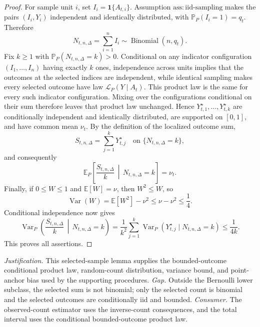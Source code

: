 \documentclass{article}
\begin{document}
\begin{proof}
For sample unit \(i\), set \(I_i=\mathbf1\{A_{t,i}\}\).  Assumption \(\mathrm{ass:iid\text{-}sampling}\) makes the pairs \((I_i,Y_i)\) independent and identically distributed, with \(\mathbb P_P(I_i=1)=q_t\).  Therefore
\[
 N_{t,n,\Delta}=\sum_{i=1}^n I_i\sim\operatorname{Binomial}(n,q_t).
\]
Fix \(k\geq1\) with \(\mathbb P_P(N_{t,n,\Delta}=k)>0\).  Conditional on any indicator configuration \((I_1,\ldots,I_n)\) having exactly \(k\) ones, independence across units implies that the outcomes at the selected indices are independent, while identical sampling makes every selected outcome have law \(\mathcal L_P(Y\mid A_t)\).  This product law is the same for every such indicator configuration.  Mixing over the configurations conditional on their sum therefore leaves that product law unchanged.  Hence \(Y_{t,1}^{\star},\ldots,Y_{t,k}^{\star}\) are conditionally independent and identically distributed, are supported on \([0,1]\), and have common mean \(\nu_t\).  By the definition of the localized outcome sum,
\[
 S_{t,n,\Delta}=\sum_{j=1}^kY_{t,j}^{\star}
 \quad\text{on }\{N_{t,n,\Delta}=k\},
\]
and consequently
\[
 \mathbb E_P\!\left[\frac{S_{t,n,\Delta}}k\,\middle|\,N_{t,n,\Delta}=k\right]=\nu_t.
\]
Finally, if \(0\leq W\leq1\) and \(\mathbb E[W]=\nu\), then \(W^2\leq W\), so
\[
 \operatorname{Var}(W)=\mathbb E[W^2]-\nu^2
 \leq\nu-\nu^2\leq\frac14.
\]
Conditional independence now gives
\[
 \operatorname{Var}_P\!\left(\frac{S_{t,n,\Delta}}k\,\middle|\,N_{t,n,\Delta}=k\right)
 =\frac1{k^2}\sum_{j=1}^k
 \operatorname{Var}_P(Y_{t,j}^{\star}\mid N_{t,n,\Delta}=k)
 \leq\frac1{4k}.
\]
This proves all assertions.
\end{proof}
\par\smallskip\noindent \textit{Justification.} This selected-sample lemma supplies the bounded-outcome conditional product law, random-count distribution, variance bound, and point-anchor bias used by the supporting procedures. \textit{Gap.} Outside the Bernoulli lower subclass, the selected sum is not binomial; only the selected count is binomial and the selected outcomes are conditionally iid and bounded. \textit{Consumer.} The observed-count estimator uses the inverse-count consequences, and the total interval uses the conditional bounded-outcome product law.
\end{document}
